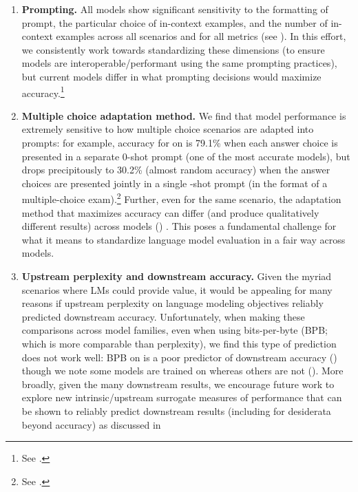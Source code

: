 \begin{enumerate}
    \item \textbf{Prompting.}
    All models show significant sensitivity to the formatting of prompt, the particular choice of in-context examples, and the number of in-context examples across all scenarios and for all metrics (see ).
    In this effort, we consistently work towards standardizing these dimensions (\eg to ensure models are interoperable/performant using the same prompting practices), but current models differ in what prompting decisions would maximize accuracy.\footnote{See .}

    \item \textbf{Multiple choice adaptation method.}
    We find that model performance is extremely sensitive to how multiple choice scenarios are adapted into prompts: for example, accuracy for \optonesevenfive on \hellaswag is 79.1\% when each answer choice is presented in a separate 0-shot prompt (\ie one of the most accurate models), but drops precipitously to 30.2\% (almost random accuracy) when the answer choices are presented jointly in a single \numincontext-shot prompt (\ie in the format of a multiple-choice exam).\footnote{See .} 
    Further, even for the same scenario, the adaptation method that maximizes accuracy can differ (and produce qualitatively different results) across models () .
    This poses a fundamental challenge for what it means to standardize language model evaluation in a fair way across models.
    
    \item \textbf{Upstream perplexity and downstream accuracy.}
    Given the myriad scenarios where LMs could provide value, it would be appealing for many reasons if upstream perplexity on language modeling objectives reliably predicted downstream accuracy.
    Unfortunately, when making these comparisons across model families, even when using bits-per-byte (BPB; which is more comparable than perplexity), we find this type of prediction does not work well: BPB on \pile is a poor predictor of downstream accuracy () though we note some models are trained on \pile whereas others are not ().
    More broadly, given the many downstream results, we encourage future work to explore new intrinsic/upstream surrogate measures of performance that can be shown to reliably predict downstream results (including for desiderata beyond accuracy) as discussed in \citet[][\S4.4.2]{bommasani2021opportunities} 
    

\end{enumerate}
